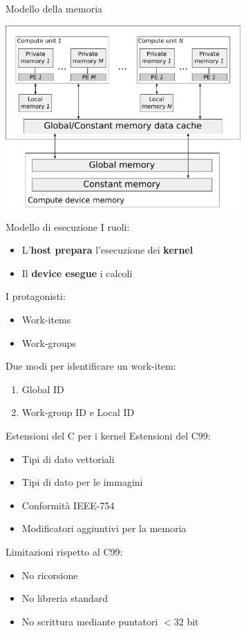 \documentclass[11pt,xcolor=dvipsnames]{beamer}
\begin{document}
\begin{frame}{Modello della memoria}
\vspace{3mm}
\begin{center}
\includegraphics[width=9cm]{img/opencl-memory-model.pdf}
\end{center}
\end{frame}

\begin{frame}{Modello di esecuzione}
I ruoli:
\begin{itemize}
\item L'\textbf{host prepara} l'esecuzione dei \textbf{kernel}
\item Il \textbf{device esegue} i calcoli
\end{itemize}

\vspace{3mm}
I protagonisti:
\begin{itemize}
\item Work-items
\item Work-groups
\end{itemize}

\vspace{3mm}
Due modi per identificare un work-item:
\begin{enumerate}
\item Global ID
\item Work-group ID e Local ID
\end{enumerate}
\end{frame}

\begin{frame}{Estensioni del C per i kernel}
Estensioni del C99:
\begin{itemize}
\item Tipi di dato vettoriali
\item Tipi di dato per le immagini
\item Conformità IEEE-754
\item Modificatori aggiuntivi per la memoria
\end{itemize}

\vspace{4mm}
Limitazioni rispetto al C99:
\begin{itemize}
\item No ricorsione
\item No libreria standard
\item No scrittura mediante puntatori $< 32$ bit
\end{itemize}
\end{frame}
\end{document}
